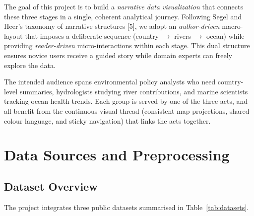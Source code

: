 \documentclass[10pt,twocolumn]{article}
\begin{document}
The goal of this project is to build a \emph{narrative data visualization}
that connects these three stages in a single, coherent analytical journey.
Following Segel and Heer's taxonomy of narrative structures [5], we adopt
an \emph{author-driven} macro-layout that imposes a deliberate sequence
(country $\to$ rivers $\to$ ocean) while providing \emph{reader-driven}
micro-interactions within each stage.
This dual structure ensures novice users receive a guided story while
domain experts can freely explore the data.

The intended audience spans environmental policy analysts who need
country-level summaries, hydrologists studying river contributions, and
marine scientists tracking ocean health trends.
Each group is served by one of the three acts, and all benefit from the
continuous visual thread (consistent map projections, shared colour language,
and sticky navigation) that links the acts together.

\section{Data Sources and Preprocessing}

\subsection{Dataset Overview}

The project integrates three public datasets summarised in
Table~\ref{tab:datasets}.

\begin{table}[ht]
\centering
\small
\caption{Datasets used across the three acts.}
\label{tab:datasets}
\end{table}
\end{document}
